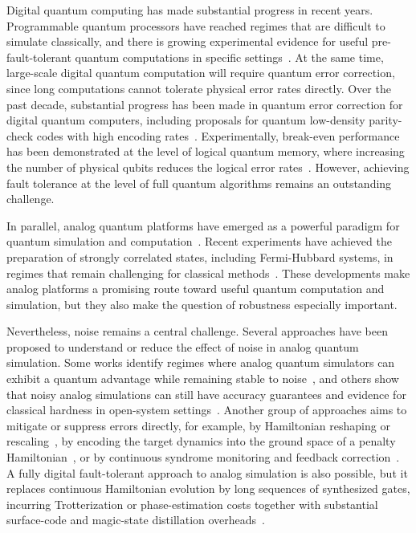 \documentclass[10pt,twocolumn,superscriptaddress,aps,amsmath,amssymb,citeautoscript,floatfix,prx,longbibliography]{revtex4-2}
\newcounter{alg}
\theoremstyle{plain}
\theoremstyle{plain}
\theoremstyle{plain}
\theoremstyle{plain}
\theoremstyle{plain}
\theoremstyle{plain}
\begin{document}
Digital quantum computing has made substantial progress in recent years. Programmable quantum processors have reached regimes that are difficult to simulate classically, and there is growing experimental evidence for useful pre-fault-tolerant quantum computations in specific settings~\cite{Arute2019,Kim2023}. At the same time, large-scale digital quantum computation will require quantum error correction, since long computations cannot tolerate physical error rates directly. Over the past decade, substantial progress has been made in quantum error correction for digital quantum computers, including proposals for quantum low-density parity-check codes with high encoding rates~\cite{Bravyi2024,Panteleev2022,Breuckmann2021,Qian1}. Experimentally, break-even performance has been demonstrated at the level of logical quantum memory, where increasing the number of physical qubits reduces the logical error rates~\cite{Krinner2022,AcharyaGoogle2025,RyanAnderson2021,daSilvaPaetznick2024,Reichardt2024Tesseract,Bluvstein2024,Reichardt2024NeutralAtom}. However, achieving fault tolerance at the level of full quantum algorithms remains an outstanding challenge.

In parallel, analog quantum platforms have emerged as a powerful paradigm for quantum simulation and computation~\cite{Bloch2012,Browaeys2020,Daley2022,Schaefer2020}. Recent experiments have achieved the preparation of strongly correlated states, including Fermi-Hubbard systems, in regimes that remain challenging for classical methods~\cite{Xu2025,Mazurenko2017,Shao2024,Chalopin2024}. 
These developments make analog platforms a promising route toward useful quantum computation and simulation, but they also make the question of robustness especially important.

Nevertheless, noise remains a central challenge. Several approaches have been proposed to understand or reduce the effect of noise in analog quantum simulation. Some works identify regimes where analog quantum simulators can exhibit a quantum advantage while remaining stable to noise~\cite{Trivedi2024AnalogStability}, and others show that noisy analog simulations can still have accuracy guarantees and evidence for classical hardness in open-system settings~\cite{Kashyap2025AnalogOpenSimulation}. Another group of approaches aims to mitigate or suppress errors directly, for example, by Hamiltonian reshaping or rescaling~\cite{Guo2025HamiltonianReshaping}, by encoding the target dynamics into the ground space of a penalty Hamiltonian~\cite{Cao2024RobustAnalog}, or by continuous syndrome monitoring and feedback correction~\cite{Atalaya2021ContinuousQEC}. A fully digital fault-tolerant approach to analog simulation is also possible, but it replaces continuous Hamiltonian evolution by long sequences of synthesized gates, incurring Trotterization or phase-estimation costs together with substantial surface-code and magic-state distillation overheads~\cite{Reiher2017ReactionMechanisms,Kivlichan2020Trotter}.
\end{document}
